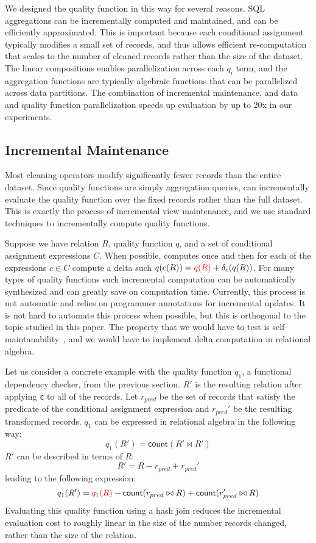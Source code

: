 We designed the quality function in this way for several reasons.  SQL aggregations can be incrementally computed and maintained, and can be efficiently approximated.  This is important because each conditional assignment typically modifies a small set of records, and thus allows efficient re-computation that scales to the number of cleaned records rather than the size of the dataset.  The linear compositions enables parallelization across each $q_i$ term, and the aggregation functions are typically algebraic functions that can be parallelized across data partitions.  The combination of incremental maintenance, and data and quality function parallelization speeds up evaluation by up to 20x in our experiments.

\subsection{Incremental Maintenance}\label{s:qualityivm}
Most cleaning operators modify significantly fewer records than the entire dataset.  Since quality functions are simply aggregation queries, \sys can incrementally evaluate the quality function over the fixed records rather than the full dataset.  
This is exactly the process of incremental view maintenance, and we use standard techniques to incrementally compute quality functions.

Suppose we have relation $R$, quality function $q$, and a set of conditional assignment expressions $C$.  When possible, \sys computes  once and then for each of the expressions $c \in C$ compute a delta such $q(c(R)) = \textcolor{red}{q(R)} + \delta_c(q(R))$.
For many types of quality functions such incremental computation can be automatically synthesized and can greatly save on computation time.
Currently, this process is not automatic and \sys relies on programmer annotations for incremental updates.
It is not hard to automate this process when possible, but this is orthogonal to the topic studied in this paper.
The property that we would have to test is self-maintanability~\cite{gupta1996data}, and we would have to implement delta computation in relational algebra. 

Let us consider a concrete example with the quality function $q_1$, a functional dependency checker, from the previous section.
$R'$ is the resulting relation after applying \texttt{c} to all of the records.
Let $r_{pred}$ be the set of records that satisfy the predicate of the conditional assignment expression and $r_{pred}'$ be the resulting transformed records.
$q_1$ can be expressed in relational algebra in the following way:
\[
q_1(R') = \textsf{count}( R' \bowtie R' )
\]
$R'$ can be described in terms of $R$:
\[
R' = R - r_{pred} + r_{pred}' 
\]
leading to the following expression:
\[
q_1(R') = \textcolor{red}{q_1(R)} - \textsf{count}( r_{pred} \bowtie R )  + \textsf{count}( r'_{pred} \bowtie R )
\]
Evaluating this quality function using a hash join reduces the incremental evaluation cost to roughly linear in the size of the number records changed, rather than the size of the relation.


